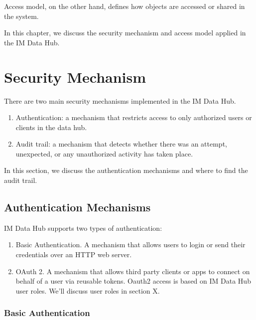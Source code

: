 \documentclass[]{book}
\providecommand{\tightlist}{%
  \setlength{\itemsep}{0pt}\setlength{\parskip}{0pt}}
\begin{document}
Access model, on the other hand, defines how objects are accessed or shared in the system.

In this chapter, we discuss the security mechanism and access model applied in the IM Data Hub.

\hypertarget{security-mechanism}{%
\section{Security Mechanism}\label{security-mechanism}}

There are two main security mechanisms implemented in the IM Data Hub.

\begin{enumerate}
\def\labelenumi{\arabic{enumi}.}
\tightlist
\item
  Authentication: a mechanism that restricts access to only authorized users or clients in the data hub.
\item
  Audit trail: a mechanism that detects whether there was an attempt, unexpected, or any unauthorized activity has taken place.
\end{enumerate}

In this section, we discuss the authentication mechanisms and where to find the audit trail.

\hypertarget{authentication-mechanisms}{%
\subsection{Authentication Mechanisms}\label{authentication-mechanisms}}

IM Data Hub supports two types of authentication:

\begin{enumerate}
\def\labelenumi{\arabic{enumi}.}
\tightlist
\item
  Basic Authentication. A mechanism that allows users to login or send their credentials over an HTTP web server.
\item
  OAuth 2. A mechanism that allows third party clients or apps to connect on behalf of a user via reusable tokens. Oauth2 access is based on IM Data Hub user roles. We'll discuss user roles in section X.
\end{enumerate}

\hypertarget{basic-authentication}{%
\subsubsection{Basic Authentication}\label{basic-authentication}}
\end{document}

